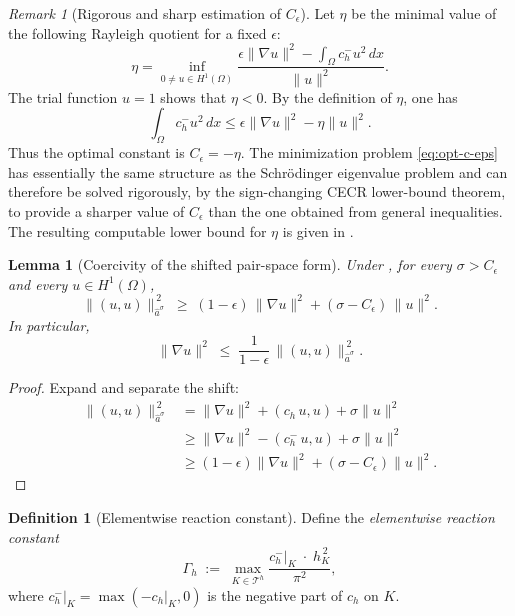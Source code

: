 \documentclass[11pt]{article}
\theoremstyle{plain}
\newtheorem{lemma}{Lemma}
\theoremstyle{definition}
\newtheorem{definition}{Definition}
\theoremstyle{remark}
\newtheorem{remark}{Remark}
\newcommand{\dx}{\,dx}
\begin{document}
\begin{remark}[Rigorous and sharp estimation of $C_\epsilon$]
\label{rmk:ceps-sharp}
Let $\eta$ be the minimal value of the following Rayleigh quotient for a fixed
$\epsilon$:
\begin{equation}
\label{eq:opt-c-eps}
\eta = \inf _{0\ne u\in H^1(\Omega)}
\frac{\epsilon\|\nabla u\|^2 - \int_{\Omega }c_h^-u^2 \dx }{\|u\|^2}.
\end{equation}
The trial function $u=1$ shows that $\eta<0$.  By the definition of
$\eta$, one has
$$
\int_\Omega c_h^-u^2 \dx \le \epsilon \|\nabla u\|^2 - \eta \|u\|^2.
$$
Thus the optimal constant is $C_\epsilon=-\eta$. The minimization problem
\eqref{eq:opt-c-eps} has essentially the same structure as the Schr\"odinger
eigenvalue problem and can therefore be solved rigorously, by the sign-changing
CECR lower-bound theorem, to provide a sharper value of $C_\epsilon$ than the
one obtained from general inequalities.  The resulting computable lower bound
for $\eta$ is given in .
\end{remark}

\begin{lemma}[Coercivity of the shifted pair-space form]
\label{lem:coercivity-sigma}
Under , for every $\sigma>C_\epsilon$ and every
$u\in H^1(\Omega)$,
\begin{equation}
\label{eq:coercivity}
  \|(u,u)\|_{\widehat a^\sigma}^{\,2}
  \;\ge\; (1-\epsilon)\,\|\nabla u\|^2
        + (\sigma-C_\epsilon)\,\|u\|^2.
\end{equation}
In particular,
\begin{equation}
\label{eq:nabla-control}
  \|\nabla u\|^2
  \;\le\; \frac{1}{1-\epsilon}\,\|(u,u)\|_{\widehat a^\sigma}^{\,2}.
\end{equation}
\end{lemma}

\begin{proof}
Expand and separate the shift:
\begin{align*}
  \|(u,u)\|_{\widehat a^\sigma}^{\,2}
  &= \|\nabla u\|^2 + (c_h\,u,u) + \sigma\|u\|^2 \\
  &\ge \|\nabla u\|^2 - (c_h^-\,u,u) + \sigma\|u\|^2 \\
  &\ge (1-\epsilon)\|\nabla u\|^2 + (\sigma-C_\epsilon)\|u\|^2.
\end{align*}
\end{proof}

\begin{definition}[Elementwise reaction constant]
\label{def:Gamma-h}
Define the \emph{elementwise reaction constant}
\begin{equation}
\label{eq:Gamma-h}
  \Gamma_h
  \;:=\; \max_{K\in\mathcal{T}^h}
         \frac{c_h^-\big|_K\;\cdot\; h_K^{\,2}}{\pi^2},
\end{equation}
where $c_h^-|_K=\max(-c_h|_K,0)$ is the negative part of $c_h$ on $K$.
\end{definition}
\end{document}
